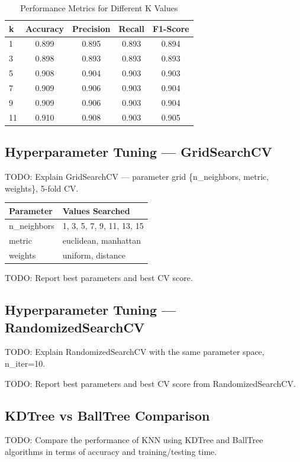 \documentclass[12pt,a4paper]{article}
\begin{document}
\begin{table}[H]
\centering
\begin{tabular}{lcccc}
\toprule
\textbf{k} & \textbf{Accuracy} & \textbf{Precision} & \textbf{Recall} & \textbf{F1-Score} \\ \midrule
1 & 0.899 & 0.895 & 0.893 & 0.894 \\
3 & 0.898 & 0.893 & 0.893 & 0.893 \\
5 & 0.908 & 0.904 & 0.903 & 0.903 \\
7 & 0.909 & 0.906 & 0.903 & 0.904 \\
9 & 0.909 & 0.906 & 0.903 & 0.904 \\
11 & 0.910 & 0.908 & 0.903 & 0.905 \\
\bottomrule
\end{tabular}
\caption{Performance Metrics for Different K Values}
\end{table}

\subsection{Hyperparameter Tuning — GridSearchCV}
TODO: Explain GridSearchCV — parameter grid \{n\_neighbors, metric, weights\}, 5-fold CV.

\begin{longtable}{|l|l|}
\hline
\textbf{Parameter} & \textbf{Values Searched} \\ \hline
n\_neighbors & 1, 3, 5, 7, 9, 11, 13, 15 \\ \hline
metric & euclidean, manhattan \\ \hline
weights & uniform, distance \\ \hline
\end{longtable}

TODO: Report best parameters and best CV score.

\subsection{Hyperparameter Tuning — RandomizedSearchCV}
TODO: Explain RandomizedSearchCV with the same parameter space, n\_iter=10.

TODO: Report best parameters and best CV score from RandomizedSearchCV.

\subsection{KDTree vs BallTree Comparison}
TODO: Compare the performance of KNN using KDTree and BallTree algorithms in terms of accuracy and training/testing time.
\end{document}
